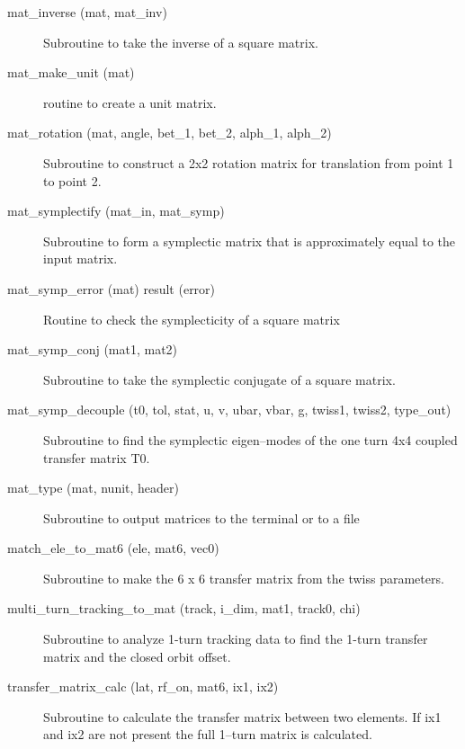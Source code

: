 \begin{description}
\item[mat_inverse (mat, mat_inv)] \Newline
Subroutine to take the inverse of a square matrix. 

\item[mat_make_unit (mat)] \Newline 
     routine to create a unit matrix.

\item[mat_rotation (mat, angle, bet_1, bet_2, alph_1, alph_2)] \Newline 
     Subroutine to construct a 2x2 rotation matrix for translation from
     point 1 to point 2.

\item[mat_symplectify (mat_in, mat_symp)] \Newline
Subroutine to form a symplectic matrix that is approximately equal to the input matrix. 

\item[mat_symp_error (mat) result (error)] \Newline
Routine to check the symplecticity of a square matrix 

\item[mat_symp_conj (mat1, mat2)] \Newline 
Subroutine to take the symplectic conjugate of a square matrix.

\item[mat_symp_decouple (t0, tol, stat, u, v, ubar, vbar, g, twiss1, twiss2, type_out)] \Newline
Subroutine to find the symplectic eigen--modes of the one turn 4x4 coupled 
transfer matrix T0. 

\item[mat_type (mat, nunit, header)] \Newline 
     Subroutine to output matrices to the terminal or to a file

\item[match_ele_to_mat6 (ele, mat6, vec0)] \Newline 
Subroutine to make the 6 x 6 transfer matrix from the twiss parameters.

\item[multi_turn_tracking_to_mat (track, i_dim, mat1, track0, chi)] \Newline
Subroutine to analyze 1-turn tracking data to find the 1-turn transfer matrix 
and the closed orbit offset.

\item[transfer_matrix_calc (lat, rf_on, mat6, ix1, ix2)] \Newline
Subroutine to calculate the transfer matrix between two elements. If
ix1 and ix2 are not present the full 1--turn matrix is calculated.


\end{description}
